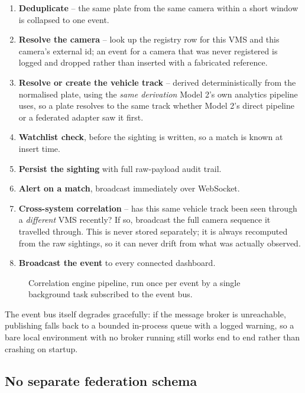 \documentclass[11pt,a4paper]{article}
\begin{document}
\begin{enumerate}
\item \textbf{Deduplicate} -- the same plate from the same camera within a
  short window is collapsed to one event.
\item \textbf{Resolve the camera} -- look up the registry row for this VMS
  and this camera's external id; an event for a camera that was never
  registered is logged and dropped rather than inserted with a fabricated
  reference.
\item \textbf{Resolve or create the vehicle track} -- derived deterministically
  from the normalised plate, using the \emph{same derivation} Model 2's own
  analytics pipeline uses, so a plate resolves to the same track whether
  Model 2's direct pipeline or a federated adapter saw it first.
\item \textbf{Watchlist check}, before the sighting is written, so a match is
  known at insert time.
\item \textbf{Persist the sighting} with full raw-payload audit trail.
\item \textbf{Alert on a match}, broadcast immediately over WebSocket.
\item \textbf{Cross-system correlation} -- has this same vehicle track been
  seen through a \emph{different} VMS recently? If so, broadcast the full
  camera sequence it travelled through. This is never stored separately;
  it is always recomputed from the raw sightings, so it can never drift
  from what was actually observed.
\item \textbf{Broadcast the event} to every connected dashboard.
\end{enumerate}

\begin{figure}[h]
\centering

\caption{Correlation engine pipeline, run once per event by a single background task subscribed to the event bus.}
\label{fig:correlation-flow}
\end{figure}

The event bus itself degrades gracefully: if the message broker is
unreachable, publishing falls back to a bounded in-process queue with a
logged warning, so a bare local environment with no broker running still
works end to end rather than crashing on startup.

\subsection{No separate federation schema}
\end{document}

